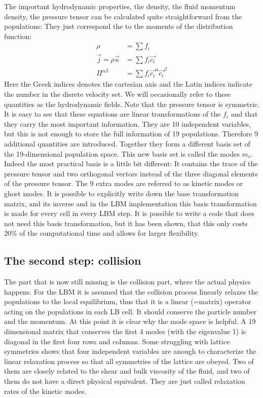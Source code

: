 The important hydrodynamic properties, the density, 
the fluid momentum density,
the pressure tensor can be calculated quite straightforward from
the populations: They just correspond the to the moments
of the distribution function: 
\begin{align}
  \rho &= \sum f_i \\
  \vec{j} = \rho \vec{u} &= \sum f_i \vec{c_i} \\
  \Pi^{\alpha \beta} &= \sum f_i \vec{c_i}^{\alpha}\vec{c_i}^{\beta} 
  \label{eq:fields}
\end{align}
Here the Greek indices denotes the cartesian axis and the
Latin indices indicate the number in the disrete velocity set.
We will occasionally refer to these quantities as the hydrodynamic fields.
Note that the pressure tensor is symmetric.
It is easy to see that these equations are linear transformations
of the $f_i$ and that they carry the most important information. They
are 10 independent variables, but this is not enough to store the
full information of 19 populations. Therefore 9 additional quantities
are introduced. Together they form a different basis set of the
19-dimensional population space. This new basis set is called
the modes $m_i$. Indeed the most practical basis is a little bit different:
It contains the trace of the pressure tensor and two orthogonal 
vectors instead of the three diagonal elements of the pressure 
tensor. The 9 extra modes are referred to as kinetic modes or
ghost modes. It is possible to explicitly write down the 
base transformation matrix, and its inverse and in the \ES{}
LBM implementation this basis transformation is made for every
cell in every LBM step. It is possible to write a code that does not
need this basis transformation, but it has been shown, that this
only costs 20\% of the computational time and allows for 
larger flexibility.

\subsection*{The second step: collision}

The part that is now still missing is the collision part, where
the actual physics happens. For the LBM it is assumed that
the collision process linearly relaxes the populations to the local
equilibrium, thus that it is a linear (=matrix) operator 
acting on the populations in each LB cell. It should conserve 
the particle number and the momentum. At this point it is clear
why the mode space is helpful. A 19 dimensional matrix that
conserves the first 4 modes (with the eigenvalue 1) is diagonal in the
first four rows and columns.
Some struggling with lattice symmetries shows that four independent
variables are anough to characterize the linear relaxation
process so that all symmetries of the lattice are obeyed. 
Two of them are closely related to 
the shear and bulk viscosity of the fluid, and two of them
do not have a direct physical equivalent. They are just called
relaxation rates of the kinetic modes.



